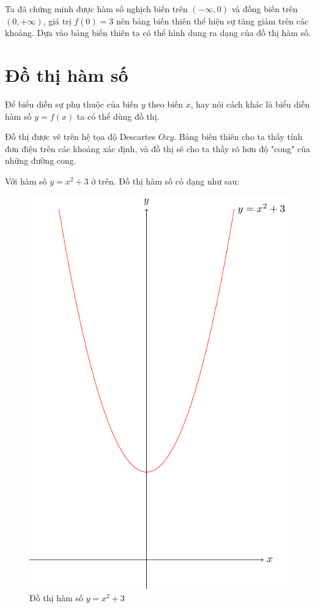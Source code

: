 Ta đã chứng minh được hàm số nghịch biến trên $(-\infty, 0)$
và đồng biến trên $(0, +\infty)$, giá trị $f(0) = 3$ nên bảng
biến thiên thể hiện sự tăng giảm trên các khoảng. Dựa vào 
bảng biến thiên ta có thể hình dung ra dạng của đồ thị hàm số.

\section{Đồ thị hàm số}

Để biểu diễn sự phụ thuộc của biến $y$ theo biến $x$, hay 
nói cách khác là biểu diễn hàm số $y=f(x)$ ta có thể dùng đồ thị.

Đồ thị được vẽ trên hệ tọa độ Descartes $Oxy$. Bảng biến thiên
cho ta thấy tính đơn điệu trên các khoảng xác định, và đồ thị
sẽ cho ta thấy rõ hơn độ "cong" của những đường cong.

\begin{example}
    Với hàm số $y = x^2 + 3$ ở trên. Đồ thị hàm số có dạng như sau:
    \begin{figure}[bh]
        \centering
        \includegraphics[scale=0.75]{../pics/algebra/algebra2.pdf}
        \caption{Đồ thị hàm số $y=x^2 + 3$}
    \end{figure}
\end{example}

